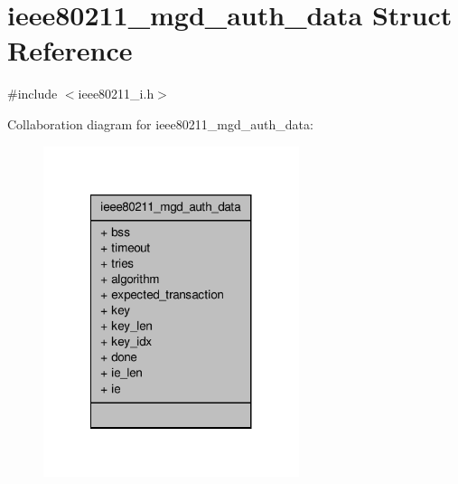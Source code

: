 \hypertarget{structieee80211__mgd__auth__data}{\section{ieee80211\-\_\-mgd\-\_\-auth\-\_\-data Struct Reference}
\label{structieee80211__mgd__auth__data}
}


{\ttfamily \#include $<$ieee80211\-\_\-i.\-h$>$}



Collaboration diagram for ieee80211\-\_\-mgd\-\_\-auth\-\_\-data\-:
\nopagebreak
\begin{figure}[H]
\begin{center}
\leavevmode
\includegraphics[width=212pt]{structieee80211__mgd__auth__data__coll__graph}
\end{center}
\end{figure}
